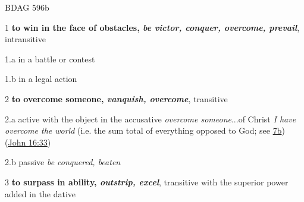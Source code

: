 				\begin{compactdesc}
					\item[BDAG 596b] \textbf{}
						\begin{compactitem}
							\item[1] \textbf{to win in the face of obstacles, \textit{be victor, conquer, overcome, prevail}}, intransitive
							\item[1.a] in a battle or contest
							\item[1.b] in a legal action
							\item[2] \textbf{to overcome someone, \textit{vanquish, overcome}}, transitive
							\item[2.a] active with the object in the accusative  \textit{overcome someone}...of Christ  \textit{I have overcome the world} (i.e. the sum total of everything opposed to God; see \hyperref[KOSMOS]{ 7b}) (\hyperref[JOHN-16-33]{John 16:33})
							\item[2.b] passive \textit{be conquered, beaten}
							\item[3] \textbf{to surpass in ability, \textit{outstrip, excel}}, transitive with the superior power added in the dative
						\end{compactitem}
				\end{compactdesc}
				
				
				
				
